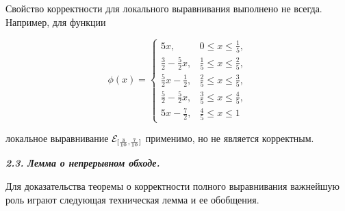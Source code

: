 \smallskip



Свойство корректности для локального выравнивания выполнено не всегда. Например, для функции

$$

\phi(x)=\left\{\begin{array}{cl}

5x, &0\le x\le\frac{1}{5},\\[2mm]

\frac{3}{2}-\frac52x,&\frac{1}{5}\le x\le\frac{2}{5},\\[2mm]

\frac{5}{2}x-\frac{1}{2},&\frac{2}{5}\le x\le\frac{3}{5},\\[2mm]

\frac{5}{2}-\frac{5}{2}x,&\frac{3}{5}\le x\le\frac{4}{5},\\[2mm]

5x-\frac{7}{2},&\frac{4}{5}\le x\le1

\end{array}\right.

$$

локальное выравнивание ${\cal E}_{[\frac{3}{10},\frac{7}{10}]}$ применимо, но не является корректным.



\smallskip



{\bf \itshape 2.3. Лемма о непрерывном обходе.}

Для доказательства теоремы о корректности полного выравнивания важнейшую роль играют следующая техническая лемма и ее обобщения.



\smallskip



